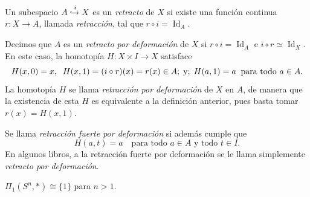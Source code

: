 \begin{definicion}
Un subespacio $A \xhookrightarrow{i} X$ es un \textit{retracto} de $X$ si existe una función continua $r \colon X \to A$, llamada \textit{retracción}, tal que $r \circ i = \operatorname{Id}_A$.

Decimos que $A$ es un \textit{retracto por deformación} de $X$ si $r \circ i = \operatorname{Id}_A$ e $i \circ r \simeq \operatorname{Id}_X$. En este caso, la homotopía $H \colon X \times I \to X$ satisface
\[
H(x, 0) = x, \;\; H(x, 1) = (i \circ r)(x) = r(x) \in A \\;\; \text{y} \\;\; H(a, 1) = a \;\; \text{para todo } a \in A.
\]
La homotopía $H$ se llama \textit{retracción por deformación} de $X$ en $A$, de manera que la existencia de esta $H$ es equivalente a la definición anterior, pues basta tomar $r(x) = H(x, 1)$.

Se llama \textit{retracción fuerte por deformación} si además cumple que
\[
H(a, t) = a \quad \text{para todo } a \in A \text{ y todo } t \in I.
\]
En algunos libros, a la retracción fuerte por deformación se le llama simplemente \textit{retracto por deformación}.
\end{definicion}
\begin{prop}
$\Pi_1(S^n, *) \cong \{1\}$ para $n > 1$.
\end{prop}

